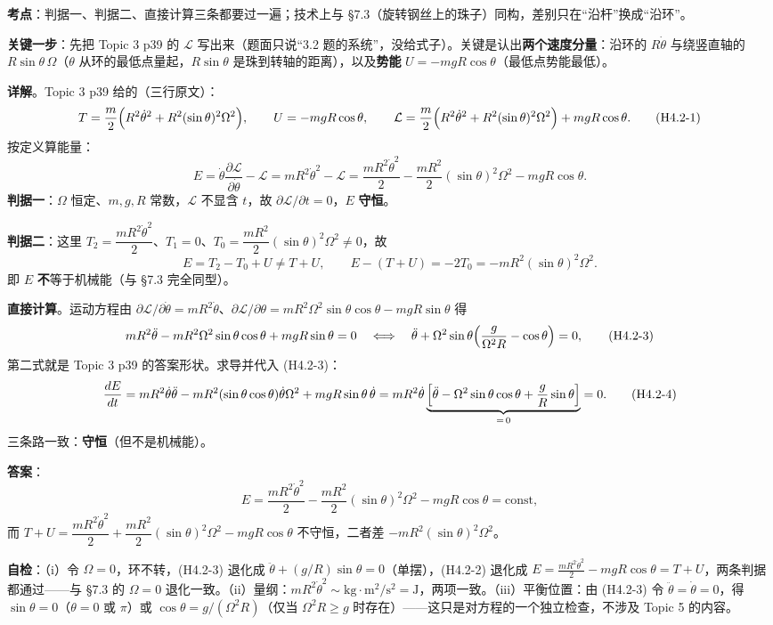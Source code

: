 \documentclass[11pt]{ctexart}
\begin{document}

\textbf{考点}：判据一、判据二、直接计算三条都要过一遍；技术上与 §7.3（旋转钢丝上的珠子）同构，差别只在“沿杆”换成“沿环”。

\textbf{关键一步}：先把 Topic 3 p39 的 $\mathcal{L}$ 写出来（题面只说“3.2 题的系统”，没给式子）。关键是认出\textbf{两个速度分量}：沿环的 $R\dot\theta$ 与绕竖直轴的 $R\sin\theta\,\Omega$（$\theta$ 从环的最低点量起，$R\sin\theta$ 是珠到转轴的距离），以及\textbf{势能} $U=-mgR\cos\theta$（最低点势能最低）。

\textbf{详解}。Topic 3 p39 给的（三行原文）：
\[
T=\frac{m}{2}\Bigl(R^2\dot\theta^2+R^2(\sin\theta)^2\Omega^2\Bigr),\qquad
U=-mgR\cos\theta,\qquad
\mathcal{L}=\frac{m}{2}\Bigl(R^2\dot\theta^2+R^2(\sin\theta)^2\Omega^2\Bigr)+mgR\cos\theta . \tag{H4.2-1}
\]
按定义算能量：
\[
E=\dot\theta\frac{\partial\mathcal{L}}{\partial\dot\theta}-\mathcal{L}
=mR^2\dot\theta^2-\mathcal{L}
=\frac{mR^2\dot\theta^2}{2}-\frac{mR^2}{2}(\sin\theta)^2\Omega^2-mgR\cos\theta . \tag{H4.2-2}
\]
\textbf{判据一}：$\Omega$ 恒定、$m,g,R$ 常数，$\mathcal{L}$ 不显含 $t$，故 $\partial\mathcal{L}/\partial t=0$，$E$ \textbf{守恒}。

\textbf{判据二}：这里 $T_2=\dfrac{mR^2\dot\theta^2}{2}$、$T_1=0$、$T_0=\dfrac{mR^2}{2}(\sin\theta)^2\Omega^2\ne0$，故
\[
E=T_2-T_0+U\ne T+U,\qquad E-(T+U)=-2T_0=-mR^2(\sin\theta)^2\Omega^2 .
\]
即 $E$ \textbf{不}等于机械能（与 §7.3 完全同型）。

\textbf{直接计算}。运动方程由 $\partial\mathcal{L}/\partial\dot\theta=mR^2\dot\theta$、$\partial\mathcal{L}/\partial\theta=mR^2\Omega^2\sin\theta\cos\theta-mgR\sin\theta$ 得
\[
mR^2\ddot\theta-mR^2\Omega^2\sin\theta\cos\theta+mgR\sin\theta=0
\quad\Longleftrightarrow\quad
\ddot\theta+\Omega^2\sin\theta\Bigl(\frac{g}{\Omega^2R}-\cos\theta\Bigr)=0 , \tag{H4.2-3}
\]
第二式就是 Topic 3 p39 的答案形状。求导并代入 (H4.2-3)：
\[
\frac{dE}{dt}=mR^2\dot\theta\ddot\theta-mR^2(\sin\theta\cos\theta)\dot\theta\Omega^2+mgR\sin\theta\,\dot\theta
=mR^2\dot\theta\underbrace{\Bigl[\ddot\theta-\Omega^2\sin\theta\cos\theta+\frac{g}{R}\sin\theta\Bigr]}_{=\,0}=0 . \tag{H4.2-4}
\]
三条路一致：\textbf{守恒}（但不是机械能）。

\textbf{答案}：
\[
E=\frac{mR^2\dot\theta^2}{2}-\frac{mR^2}{2}(\sin\theta)^2\Omega^2-mgR\cos\theta=\text{const},
\]
而 $T+U=\dfrac{mR^2\dot\theta^2}{2}+\dfrac{mR^2}{2}(\sin\theta)^2\Omega^2-mgR\cos\theta$ 不守恒，二者差 $-mR^2(\sin\theta)^2\Omega^2$。

\textbf{自检}：（i）令 $\Omega=0$，环不转，(H4.2-3) 退化成 $\ddot\theta+(g/R)\sin\theta=0$（单摆），(H4.2-2) 退化成 $E=\frac{mR^2\dot\theta^2}{2}-mgR\cos\theta=T+U$，两条判据都通过——与 §7.3 的 $\Omega=0$ 退化一致。（ii）量纲：$mR^2\dot\theta^2\sim\mathrm{kg\cdot m^2/s^2}=\mathrm{J}$，两项一致。（iii）平衡位置：由 (H4.2-3) 令 $\ddot\theta=\dot\theta=0$，得 $\sin\theta=0$（$\theta=0$ 或 $\pi$）或 $\cos\theta=g/(\Omega^2R)$（仅当 $\Omega^2R\ge g$ 时存在）——这只是对方程的一个独立检查，不涉及 Topic 5 的内容。
\end{document}

